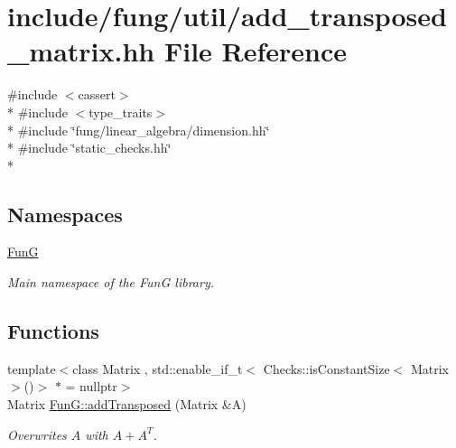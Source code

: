 \hypertarget{add__transposed__matrix_8hh}{}\section{include/fung/util/add\+\_\+transposed\+\_\+matrix.hh File Reference}
\label{add__transposed__matrix_8hh}
{\ttfamily \#include $<$cassert$>$}\\*
{\ttfamily \#include $<$type\+\_\+traits$>$}\\*
{\ttfamily \#include \char`\"{}fung/linear\+\_\+algebra/dimension.\+hh\char`\"{}}\\*
{\ttfamily \#include \char`\"{}static\+\_\+checks.\+hh\char`\"{}}\\*
\subsection*{Namespaces}
\begin{DoxyCompactItemize}
\item 
 \hyperlink{namespaceFunG}{FunG}
\begin{DoxyCompactList}\small\item\em Main namespace of the FunG library. \end{DoxyCompactList}\end{DoxyCompactItemize}
\subsection*{Functions}
\begin{DoxyCompactItemize}
\item 
{\footnotesize template$<$class Matrix , std\+::enable\+\_\+if\+\_\+t$<$ Checks\+::is\+Constant\+Size$<$ Matrix $>$()$>$ $\ast$  = nullptr$>$ }\\Matrix \hyperlink{namespaceFunG_a0211d0d26c669d56b5113fd2292902e5}{Fun\+G\+::add\+Transposed} (Matrix \&A)
\begin{DoxyCompactList}\small\item\em Overwrites $A$ with $A+A^T$. \end{DoxyCompactList}\end{DoxyCompactItemize}
